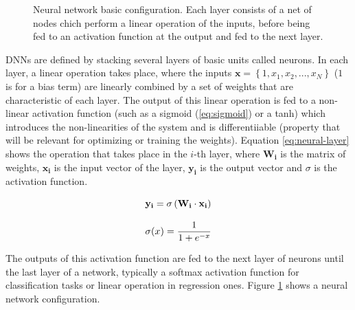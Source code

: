 \begin{figure}[h]
    \centering
    

    \caption{Neural network basic configuration. Each layer consists of a net of nodes chich perform a linear operation of the inputs, before being fed to an activation function at the output and fed to the next layer.}
    \label{fig:neural-net}
\end{figure}

DNNs are defined by stacking several layers of basic units called neurons. In each layer, a linear operation takes place, where the inputs $\mathbf{x}= \left \{ 1, x_1, x_2, ..., x_N \right \}$ ($1$ is for a bias term) are linearly combined by a set of weights that are characteristic of each layer. The output of this linear operation is fed to a non-linear activation function (such as a sigmoid (\ref{eq:sigmoid}) or a tanh) which introduces the non-linearities of the system and is differentiiable (property that will be relevant for optimizing or training the weights). Equation \ref{eq:neural-layer} shows the operation that takes place in the $i$-th layer, where $\mathbf{W_i}$  is the matrix of weights, $\mathbf{x_i}$ is the input vector of the layer, $\mathbf{y_i}$ is the output vector and $\sigma$ is the activation function.

\begin{equation}
    \centering
    \mathbf{y_i} = \sigma \left ( \mathbf{W_i} \cdot \mathbf{x_i} \right )
    \label{eq:neural-layer}
\end{equation}

\begin{equation}
    \centering
    \sigma (x) = \frac{1}{1 + e^{-x}} 
    \label{eq:sigmoid}
\end{equation}

The outputs of this activation function are fed to the next layer of neurons until the last layer of a network, typically a softmax activation function for classification tasks or linear operation in regression ones. Figure \ref{fig:neural-net} shows a neural network configuration.

